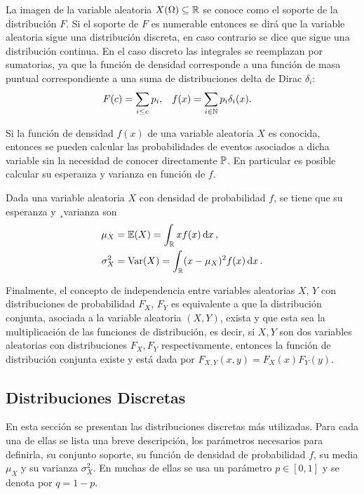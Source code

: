 La imagen de la variable aleatoria \(X(\Omega) \subseteq \mathbb{R}\) se conoce como el soporte de la distribución \(F\). Si el soporte de \(F\) es numerable entonces se dirá que la variable aleatoria sigue una distribución discreta, en caso contrario se dice que sigue una distribución continua. En el caso discreto las integrales se reemplazan por sumatorias, ya que la función de densidad corresponde a una función de masa puntual correspondiente a una suma de distribuciones delta de Dirac \(\delta_i\):
\begin{align*}
	F(c) &= \sum_{i\leq c} p_i,		& f(x) &= \sum_{i \in \mathbb{N}} p_i \delta_i(x).
\end{align*}

Si la función de densidad \(f(x)\) de una variable aleatoria \(X\) es conocida, entonces se pueden calcular las probabilidades de eventos asociados a dicha variable sin la necesidad de conocer directamente \(\mathbb{P}\). En particular es posible calcular su esperanza y varianza en función de \(f\).

\begin{proposition}
	Dada una variable aleatoria \(X\) con densidad de probabilidad \(f\), se tiene que su esperanza y ¸varianza son
	\begin{align*}
		\mu_X		&= \mathbb{E}(X) = \int_{\mathbb{R}} x f(x) \dd{x}, \\
		\sigma_X^2	&= \operatorname{Var}(X) = \int_{\mathbb{R}} (x - \mu_X)^2 f(x) \dd{x}.
	\end{align*}
\end{proposition}

Finalmente, el concepto de independencia entre variables aleatorias \(X\), \(Y\) con distribuciones de probabilidad \(F_X\), \(F_Y\) es equivalente a que la distribución conjunta, asociada a la variable aleatoria \((X, Y)\), exista y que esta sea la multiplicación de las funciones de distribución, es decir, si \(X, Y\) son dos variables aleatorias con distribuciones \(F_X, F_Y\) respectivamente, entonces la función de distribución conjunta existe y está dada por \(F_{X, Y}(x, y) = F_X(x) F_Y(y)\).

\subsection{Distribuciones Discretas}

En esta sección se presentan las distribuciones discretas más utilizadas. Para cada una de ellas se lista una breve descripción, los parámetros necesarios para definirla, su conjunto soporte, su función de densidad de probabilidad \(f\), su media \(\mu_X\) y su varianza \(\sigma^2_X\). En muchas de ellas se usa un parámetro \(p \in [0, 1]\) y se denota por \(q = 1 - p\).

